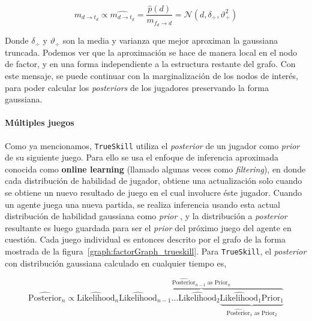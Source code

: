 \documentclass[11pt,twoside,spanish]{report} %
\begin{document}
\begin{equation}\label{eq:aprox_}
 m_{d \rightarrow t_d} \propto\widehat{m_{d \rightarrow t_d}} = \frac{\widehat{p}(d)}{m_{f_d \rightarrow d}} = \mathcal{N}(d,\delta_{\div},\vartheta_{\div}^2 )
\end{equation}

Donde $\delta_{\div}$ y $\vartheta_{\div}$ son la media y varianza que mejor aproximan la gaussiana truncada.
Podemos ver que la aproximaci\'on se hace de manera local en el nodo de factor, y en una forma independiente a la estructura restante del grafo.
Con este mensaje, se puede continuar con la marginalizaci\'on de los nodos de inter\'es, para poder calcular los \textit{posteriors} de los jugadores preservando la forma gaussiana.



\paragraph{M\'ultiples juegos}

Como ya mencionamos, \texttt{TrueSkill} utiliza el \textit{posterior} de un jugador como \textit{prior} de su siguiente juego.
Para ello se usa el enfoque de inferencia aproximada conocida como \textbf{online learning} (llamado algunas veces como \textit{filtering}), en donde cada distribuci\'on de habilidad de jugador, obtiene una actualizaci\'on solo cuando se obtiene un nuevo resultado de juego en el cual involucre \'este jugador.
Cuando un agente juega una nueva partida, se realiza inferencia usando esta actual distribuci\'on de habilidad gaussiana como \textit{prior} , y la distribuci\'on a \textit{posterior} resultante es luego guardada para ser el \textit{prior} del pr\'oximo juego del agente en cuesti\'on.
Cada juego individual es entonces descrito por el grafo de la forma mostrada de la figura~\ref{graph:factorGraph_trueskill}.
Para \texttt{TrueSkill}, el \textit{posterior} con distribuci\'on gaussiana calculado en cualquier tiempo es,
 
\begin{equation}
 \widehat{\text{Posterior}}_n \propto \widehat{\text{Likelihood}}_n \overbrace{\widehat{\text{Likelihood}}_{n-1} \dots \widehat{\text{Likelihood}}_{2} \underbrace{\widehat{\text{Likelihood}}_{1} \text{Prior}_1}_{\widehat{\text{Posterior}}_{1} \text{ as } \text{Prior}_{2}} }^{\widehat{\text{Posterior}}_{n-1} \text{ as } \text{Prior}_{n}} 
\end{equation}
\end{document}
